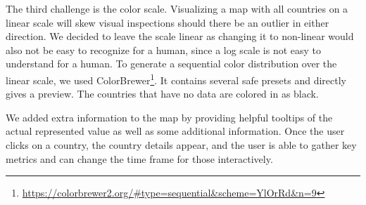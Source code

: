 The third challenge is the color scale. Visualizing a map with all countries on a linear scale will skew visual inspections should there be an outlier in either direction. We decided to leave the scale linear as changing it to non-linear would also not be easy to recognize for a human, since a log scale is not easy to understand for a human. To generate a sequential color distribution over the linear scale, we used ColorBrewer\footnote{\href{https://colorbrewer2.org/\#type=sequential&scheme=YlOrRd&n=9}{https://colorbrewer2.org/\#type=sequential\&scheme=YlOrRd\&n=9}}. It contains several safe presets and directly gives a preview. The countries that have no data are colored in as black.

We added extra information to the map by providing helpful tooltips of the actual represented value as well as some additional information. Once the user clicks on a country, the country details appear, and the user is able to gather key metrics and can change the time frame for those interactively.
